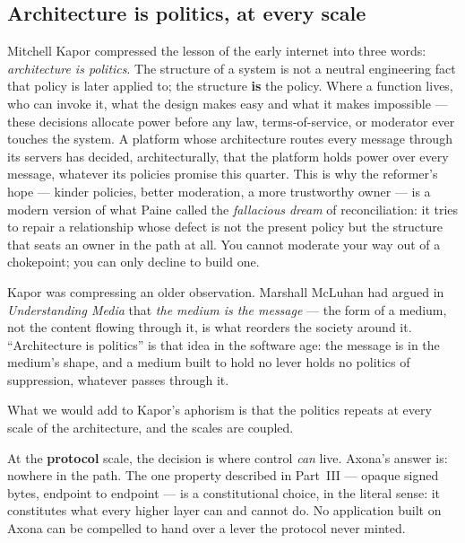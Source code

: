 \documentclass[nobib,justified]{tufte-handout}
\begin{document}
\subsection{Architecture is politics, at every scale}

Mitchell Kapor compressed the lesson of the early internet into three words:
\emph{architecture is politics}. The structure of a system is not a
neutral engineering fact that policy is later applied to; the structure
\textbf{is} the policy. Where a function lives, who can invoke it, what the
design makes easy and what it makes impossible --- these decisions allocate
power before any law, terms-of-service, or moderator ever touches the system.
A platform whose architecture routes every message through its servers has
decided, architecturally, that the platform holds power over every message,
whatever its policies promise this quarter. This is why the reformer's hope
--- kinder policies, better moderation, a more trustworthy owner --- is a
modern version of what Paine called the \emph{fallacious dream} of
reconciliation: it tries to repair a relationship whose defect is not the
present policy but the structure that seats an owner in the path at all. You
cannot moderate your way out of a chokepoint; you can only decline to build
one.

Kapor was compressing an older observation. Marshall McLuhan had argued in
\emph{Understanding Media} that \emph{the medium is the message} --- the form
of a medium, not the content flowing through it, is what reorders the society
around it. ``Architecture is politics'' is that idea in the software age: the
message is in the medium's shape, and a medium built to hold no lever holds no
politics of suppression, whatever passes through it.

What we would add to Kapor's aphorism is that the politics repeats at every
scale of the architecture, and the scales are coupled.

At the \textbf{protocol} scale, the decision is where control \emph{can}
live. Axona's answer is: nowhere in the path. The one property described in
Part~III --- opaque signed bytes, endpoint to endpoint --- is a
constitutional choice, in the literal sense: it constitutes what every higher
layer can and cannot do. No application built on Axona can be compelled to
hand over a lever the protocol never minted.
\end{document}
